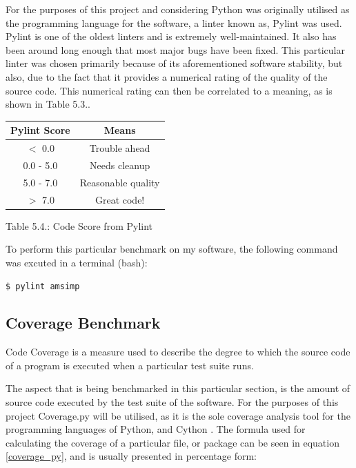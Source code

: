 For the purposes of this project and considering Python was originally utilised as the programming language for the software, a linter known as, Pylint\cite{pylint} was used. Pylint is one of the oldest linters and is extremely well-maintained. It also has been around long enough that most major bugs have been fixed. This particular linter was chosen primarily because of its aforementioned software stability, but also, due to the fact that it provides a numerical rating of the quality of the source code. This numerical rating can then be correlated to a meaning, as is shown in Table 5.3.\cite{pylint_score}. 
\hfill

\begin{center}
\begin{tabular}{ c|c } 
 Pylint Score & Means \\
 \hline
 $<$ 0.0 & Trouble ahead \\
 0.0 - 5.0 & Needs cleanup \\
 5.0 - 7.0 & Reasonable quality \\
 $>$ 7.0 & Great code!
\end{tabular}\par
\bigskip
Table 5.4.: Code Score from Pylint
\end{center}

To perform this particular benchmark on my software, the following command was excuted in a terminal (bash):

\begin{verbatim}
$ pylint amsimp
\end{verbatim}

\subsection{Coverage Benchmark}
\begin{definition}
Code Coverage is a measure used to describe the degree to which the source code of a program is executed when a particular test suite runs.
\end{definition}

The aspect that is being benchmarked in this particular section, is the amount of source code executed by the test suite of the software. For the purposes of this project Coverage.py will be utilised, as it is the sole coverage analysis tool for the programming languages of Python, and Cython \cite{coverage_py}. The formula used for calculating the coverage of a particular file, or package can be seen in equation \ref{coverage_py}, and is usually presented in percentage form:

